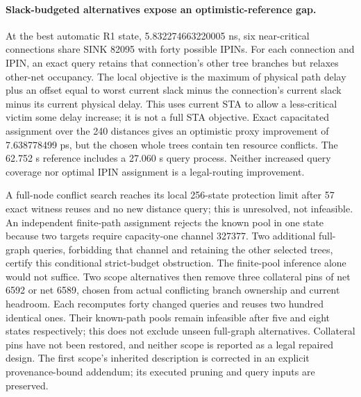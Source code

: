 \paragraph{Slack-budgeted alternatives expose an optimistic-reference gap.}
At the best automatic R1 state, 5.832274663220005 ns, six near-critical connections share SINK 82095 with forty possible IPINs. For each connection and IPIN, an exact query retains that connection's other tree branches but relaxes other-net occupancy. The local objective is the maximum of physical path delay plus an offset equal to worst current slack minus the connection's current slack minus its current physical delay. This uses current STA to allow a less-critical victim some delay increase; it is not a full STA objective. Exact capacitated assignment over the 240 distances gives an optimistic proxy improvement of 7.638778499 ps, but the chosen whole trees contain ten resource conflicts. The 62.752 s reference includes a 27.060 s query process. Neither increased query coverage nor optimal IPIN assignment is a legal-routing improvement.

A full-node conflict search reaches its local 256-state protection limit after 57 exact witness reuses and no new distance query; this is unresolved, not infeasible. An independent finite-path assignment rejects the known pool in one state because two targets require capacity-one channel 327377. Two additional full-graph queries, forbidding that channel and retaining the other selected trees, certify this conditional strict-budget obstruction. The finite-pool inference alone would not suffice. Two scope alternatives then remove three collateral pins of net 6592 or net 6589, chosen from actual conflicting branch ownership and current headroom. Each recomputes forty changed queries and reuses two hundred identical ones. Their known-path pools remain infeasible after five and eight states respectively; this does not exclude unseen full-graph alternatives. Collateral pins have not been restored, and neither scope is reported as a legal repaired design. The first scope's inherited description is corrected in an explicit provenance-bound addendum; its executed pruning and query inputs are preserved.

